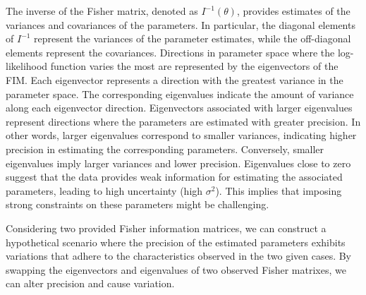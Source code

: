 \documentclass{article}
\begin{document}
The inverse of the Fisher matrix, denoted as $I^{-1}(\theta)$, provides estimates of the variances and covariances of the parameters. In particular, the diagonal elements of $I^{-1}$ represent the variances of the parameter estimates, while the off-diagonal elements represent the covariances. Directions in parameter space where the log-likelihood function varies the most are represented by the eigenvectors of the FIM. Each eigenvector represents a direction with the greatest variance in the parameter space. The corresponding eigenvalues indicate the amount of variance along each eigenvector direction. Eigenvectors associated with larger eigenvalues represent directions where the parameters are estimated with greater precision. In other words, larger eigenvalues correspond to smaller variances, indicating higher precision in estimating the corresponding parameters. Conversely, smaller eigenvalues imply larger variances and lower precision. Eigenvalues close to zero suggest that the data provides weak information for estimating the associated parameters, leading to high uncertainty (high $\sigma^2$). This implies that imposing strong constraints on these parameters might be challenging.

Considering two provided Fisher information matrices, we can construct a hypothetical scenario where the precision of the estimated parameters exhibits variations that adhere to the characteristics observed in the two given cases. By swapping the eigenvectors and eigenvalues of two observed Fisher matrixes, we can alter precision and cause variation.
\end{document}
